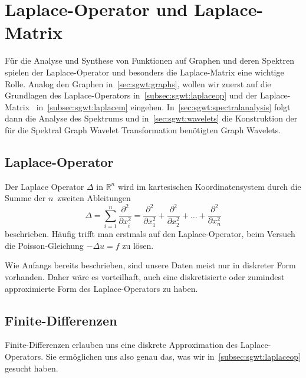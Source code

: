 
\section{Laplace-Operator und Laplace-Matrix\label{sec:sgwt:laplace}}

F\"ur die Analyse und Synthese von Funktionen auf Graphen und deren Spektren 
spielen der Laplace-Operator und besonders die Laplace-Matrix eine wichtige 
Rolle. Analog den Graphen in~\cref{sec:sgwt:graphs}, wollen wir zuerst 
auf die Grundlagen des Laplace-Operators in~\cref{subsec:sgwt:laplaceop} und 
der Laplace-Matrix~\laplaceL{} in~\cref{subsec:sgwt:laplacem} eingehen. 
In~\cref{sec:sgwt:spectralanalysis} folgt dann die Analyse des Spektrums und 
in~\cref{sec:sgwt:wavelets} die Konstruktion der f\"ur die Spektral Graph 
Wavelet Transformation ben\"otigten Graph Wavelets.

\subsection{Laplace-Operator\label{subsec:sgwt:laplaceop}}

Der Laplace Operator $\Delta$ in $\mathbb{R}^n$ wird im kartesischen 
Koordinatensystem durch die Summe der $n$~zweiten Ableitungen
\begin{equation*}
\Delta = 
\sum_{i = 1}^{n}\frac{\partial^2}{\partial x_i^2}
=
\frac{\partial^2}{\partial x_1^2}
+ \frac{\partial^2}{\partial x_2^2}
+ \dots
+ \frac{\partial^2}{\partial x_n^2}
\end{equation*}
beschrieben. H\"aufig trifft man erstmals auf den Laplace-Operator, beim 
Versuch die Poisson-Gleichung $-\Delta u = f$ zu l\"osen.

Wie Anfangs bereits beschrieben, sind unsere Daten meist nur in diskreter Form 
vorhanden. Daher w\"are es vorteilhaft, auch eine diskretisierte oder zumindest 
approximierte Form des Laplace-Operators zu haben.

\subsection{Finite-Differenzen\label{subsec:sgwt:finitediff}}

Finite-Differenzen erlauben uns eine diskrete Approximation des 
Laplace-Operators. Sie erm\"oglichen uns also genau das, was wir 
in~\cref{subsec:sgwt:laplaceop} gesucht haben.

